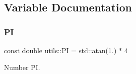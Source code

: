 \subsection{Variable Documentation}
\mbox{\label{namespaceutils_a92ce7d254229929886551de7417e1912}} 
\subsubsection{\texorpdfstring{PI}{PI}}
{\footnotesize\ttfamily const double utils\+::\+PI = std\+::atan(1.) $\ast$ 4}

Number PI. 